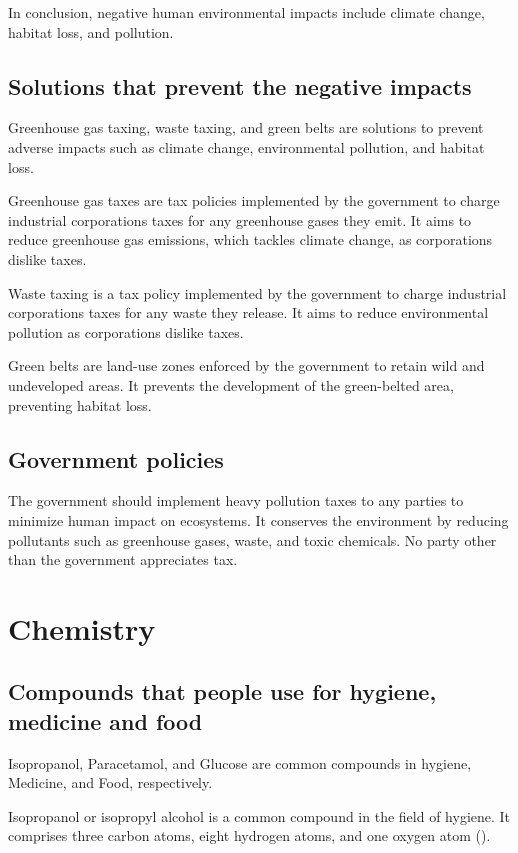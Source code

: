\documentclass{article}
\begin{document}
In conclusion, negative human environmental impacts include climate change, habitat loss, and pollution.
 
\subsection{Solutions that prevent the negative impacts}
Greenhouse gas taxing, waste taxing, and green belts are solutions to prevent adverse impacts such as climate change, environmental pollution, and habitat loss. 
 
Greenhouse gas taxes are tax policies implemented by the government to charge industrial corporations taxes for any greenhouse gases they emit. It aims to reduce greenhouse gas emissions, which tackles climate change, as corporations dislike taxes. 
 
Waste taxing is a tax policy implemented by the government to charge industrial corporations taxes for any waste they release. It aims to reduce environmental pollution as corporations dislike taxes. 
 
Green belts are land-use zones enforced by the government to retain wild and undeveloped areas. It prevents the development of the green-belted area, preventing habitat loss.
 
\subsection{Government policies}
The government should implement heavy pollution taxes to any parties to minimize human impact on ecosystems. It conserves the environment by reducing pollutants such as greenhouse gases, waste, and toxic chemicals. No party other than the government appreciates tax. 
 
\newpage
 
\section{Chemistry}
 
\subsection{Compounds that people use for hygiene, medicine and food}
Isopropanol, Paracetamol, and Glucose are common compounds in hygiene, Medicine, and Food, respectively. 
 
Isopropanol or isopropyl alcohol is a common compound in the field of hygiene.  It comprises three carbon atoms, eight hydrogen atoms, and one oxygen atom (). 
 
\end{document}
